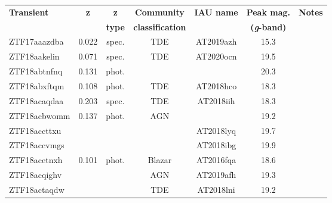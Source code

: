 \begin{table*}
  \begin{tabular}{l  c  c  c   c  c  c}
    \small
    \textbf{Transient} & \textbf{z} & \textbf{z}    & \textbf{Community}      & \textbf{IAU name} & \textbf{Peak mag.}         & \textbf{Notes} \\
                       &            & \textbf{type} & \textbf{classification} &                   & \textbf{(\textit{g}-band)} &                \\ \hline
    ZTF17aaazdba       & 0.022      & spec.         & TDE                     & AT2019azh         & 15.3                       &                \\
    ZTF18aakelin       & 0.071      & spec.         & TDE                     & AT2020ocn         & 19.5                       &                \\
    ZTF18abtnfnq       & 0.131      & phot.         & ~                       & ~                 & 20.3                       &                \\
    ZTF18abxftqm       & 0.108      & phot.         & TDE                     & AT2018hco         & 18.3                       &                \\
    ZTF18acaqdaa       & 0.203      & spec.         & TDE                     & AT2018iih         & 18.3                       &                \\
    ZTF18acbwomm       & 0.137      & phot.         & AGN                     & ~                 & 19.2                       &                \\
    ZTF18accttxu       & ~          & ~             & ~                       & AT2018lyq         & 19.7                       &                \\
    ZTF18accvmgs       & ~          & ~             & ~                       & AT2018ibg         & 19.9                       &                \\
    ZTF18acetnxh       & 0.101      & phot.         & Blazar                  & AT2016fqa         & 18.6                       &                \\
    ZTF18acqighv       & ~          & ~             & AGN                     & AT2019afh         & 19.3                       &                \\
    ZTF18actaqdw       & ~          & ~             & TDE                     & AT2018lni         & 19.2                       &                \\

\end{tabular}
\end{table*}

